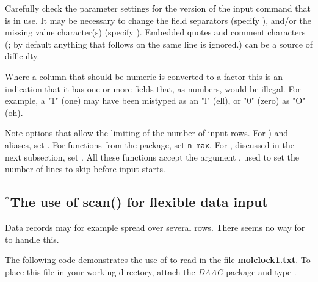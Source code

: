 Carefully check the parameter settings for the
version of the input command that is in use.  It may be necessary to
change the field separators (specify ), and/or the missing
value character(s) (specify ). Embedded quotes and
comment characters (\txtt{\#}; by default anything that follows
\txtt{\#} on the same line is ignored.) can be a source of difficulty.

Where a column that should be numeric is converted to a factor this is
an indication that it has one or more fields that, as numbers, would
be illegal.  For example, a "1" (one) may have been mistyped as an "l"
(ell), or "0" (zero) as "O" (oh).

Note options that allow the limiting of the number of input rows.
For ) and aliases, set .  For
functions from the  package, set \texttt{n\_max}.
For , discussed in the next subsection, set
. All these functions accept the argument ,
used to set the number of lines to skip before input starts.

\subsection{$^*$The use of scan() for flexible data input}

Data records may for example spread over several rows. There seems no
way for  to handle this.

The following code demonstrates the use of  to read in
the file \textbf{molclock1.txt}.  To place this file in your working
directory, attach the \textit{DAAG} package and type
.

